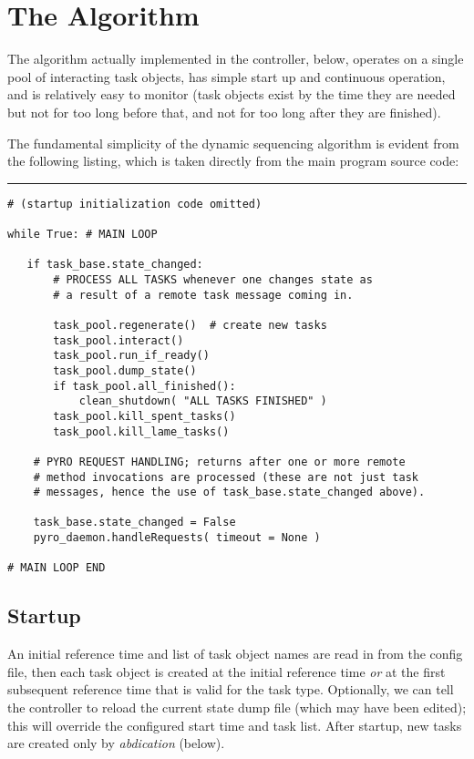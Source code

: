 \documentclass[11pt,a4paper]{report}
\begin{document}
\section{The Algorithm}

The algorithm actually implemented in the controller, below, operates on
a single pool of interacting task objects, has simple start up and
continuous operation, and is relatively easy to monitor (task objects
exist by the time they are needed but not for too long before that, and
not for too long after they are finished). 

\pagebreak

The fundamental simplicity of the dynamic sequencing algorithm is
evident from the following listing, which is taken directly from the
main program source code:

\noindent
\rule{5cm}{.2mm}
\begin{lstlisting}
# (startup initialization code omitted)

while True: # MAIN LOOP

   if task_base.state_changed:
       # PROCESS ALL TASKS whenever one changes state as
       # a result of a remote task message coming in.

       task_pool.regenerate()  # create new tasks
       task_pool.interact()
       task_pool.run_if_ready()
       task_pool.dump_state()
       if task_pool.all_finished():
           clean_shutdown( "ALL TASKS FINISHED" )
       task_pool.kill_spent_tasks()
       task_pool.kill_lame_tasks()

    # PYRO REQUEST HANDLING; returns after one or more remote
    # method invocations are processed (these are not just task
    # messages, hence the use of task_base.state_changed above).

    task_base.state_changed = False
    pyro_daemon.handleRequests( timeout = None )

# MAIN LOOP END
\end{lstlisting}


\subsection{Startup}

An initial reference time and list of task object names are read in from
the config file, then each task object is created at the initial
reference time {\em or} at the first subsequent reference time that is
valid for the task type. Optionally, we can tell the controller to
reload the current state dump file (which may have been edited); this
will override the configured start time and task list. After startup,
new tasks are created only by {\em abdication} (below).
\end{document}
